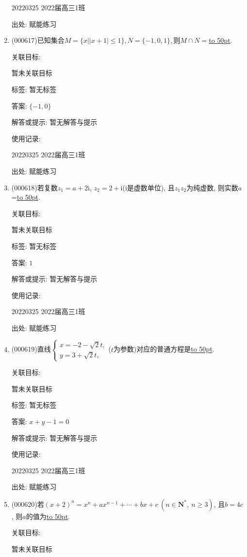 \documentclass[10pt,a4paper]{article}
\newcommand{\blank}[1]{\underline{\hbox to #1pt{}}}
\begin{document}
\begin{enumerate}[1.]
20220325	2022届高三1班	


出处: 赋能练习
\item { (000617)}已知集合$M=\{x||x+1|\le 1\},N=\{-1,0,1\},$则$M\cap N=$\blank{50}.


关联目标:

暂未关联目标



标签: 暂无标签

答案: $\{-1,0\}$

解答或提示: 暂无解答与提示

使用记录:

20220325	2022届高三1班	


出处: 赋能练习
\item { (000618)}若复数$z_1=a+2\mathrm{i}$, $z_2=2+\mathrm{i}$($\mathrm{i}$是虚数单位), 且$z_1z_2$为纯虚数, 则实数$a$=\blank{50}.


关联目标:

暂未关联目标



标签: 暂无标签

答案: $1$

解答或提示: 暂无解答与提示

使用记录:

20220325	2022届高三1班	


出处: 赋能练习
\item { (000619)}直线$\begin{cases} x=-2-\sqrt2 t,  \\y=3+\sqrt2 t, \end{cases}$($t$为参数)对应的普通方程是\blank{50}.


关联目标:

暂未关联目标



标签: 暂无标签

答案: $x+y-1=0$

解答或提示: 暂无解答与提示

使用记录:

20220325	2022届高三1班	


出处: 赋能练习
\item { (000620)}若$(x+2)^n=x^n+ax^{n-1}+\cdots+bx+c \ (n\in \mathbf{N}^*, \ n\ge 3)$, 且$b=4c$, 则$a$的值为\blank{50}.


关联目标:

暂未关联目标




\end{enumerate}
\end{document}
